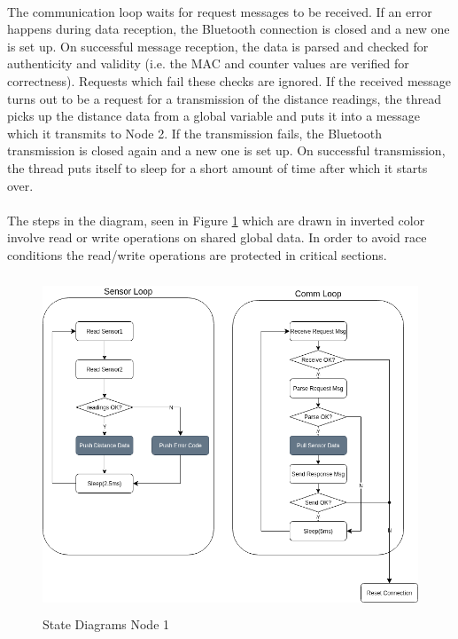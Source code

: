 \paragraph{}
The communication loop waits for request messages to be received. If an error happens during data reception, the Bluetooth connection is closed and a new one is set up. On successful message reception, the data is parsed and checked for authenticity and validity (i.e. the MAC and counter values are verified for correctness). Requests which fail these checks are ignored. If the received message turns out to be a request for a transmission of the distance readings, the thread picks up the distance data from a global variable and puts it into a message which it transmits to Node 2. If the transmission fails, the Bluetooth transmission is closed again and a new one is set up. On successful transmission, the thread puts itself to sleep for a short amount of time after which it starts over.

\paragraph{}
The steps in the diagram, seen in Figure \ref{fig:stateDiagramNode1} which are drawn in inverted color involve read or write operations on shared global data. In order to avoid race conditions the read/write operations are protected in critical sections.

\begin{figure}[h]
	\includegraphics[height=100mm]{images/StateDiagramNode1.png}
	\centering
	\caption{State Diagrams Node 1}
	\label{fig:stateDiagramNode1}
\end{figure}


